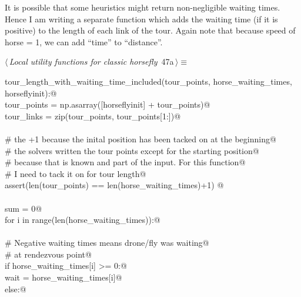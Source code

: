 \documentclass[11.5pt]{report}
\begin{document}
\vspace{-0.8cm}\newchunk It is possible that some heuristics might return non-negligible
      waiting times. Hence I am writing a separate function which
      adds the waiting time (if it is positive) to the length of 
      each link of the tour. Again note that because 
      speed of horse = 1, we can add ``time'' to ``distance''. 

\begin{flushleft} \small\label{scrap68}\raggedright\small
{} $\langle\,${\itshape Local utility functions for classic horsefly}\nobreak\ {\footnotesize {47a}}$\,\rangle\equiv$
\vspace{-1ex}
\begin{list}{}{} \item
\mbox{}\verb@def tour_length_with_waiting_time_included(tour_points, horse_waiting_times, horseflyinit):@\\
\mbox{}\verb@      tour_points   = np.asarray([horseflyinit] + tour_points)@\\
\mbox{}\verb@      tour_links    = zip(tour_points, tour_points[1:])@\\
\mbox{}\verb@@\\
\mbox{}\verb@      # the +1 because the inital position has been tacked on at the beginning@\\
\mbox{}\verb@      # the solvers written the tour points except for the starting position@\\
\mbox{}\verb@      # because that is known and part of the input. For this function@\\
\mbox{}\verb@      # I need to tack it on for tour length@\\
\mbox{}\verb@      assert(len(tour_points) == len(horse_waiting_times)+1) @\\
\mbox{}\verb@@\\
\mbox{}\verb@      sum = 0@\\
\mbox{}\verb@      for i in range(len(horse_waiting_times)):@\\
\mbox{}\verb@@\\
\mbox{}\verb@          # Negative waiting times means drone/fly was waiting@\\
\mbox{}\verb@          # at rendezvous point@\\
\mbox{}\verb@          if horse_waiting_times[i] >= 0:@\\
\mbox{}\verb@              wait = horse_waiting_times[i]@\\
\mbox{}\verb@          else:@\\

\end{list}
\end{flushleft}
\end{document}

